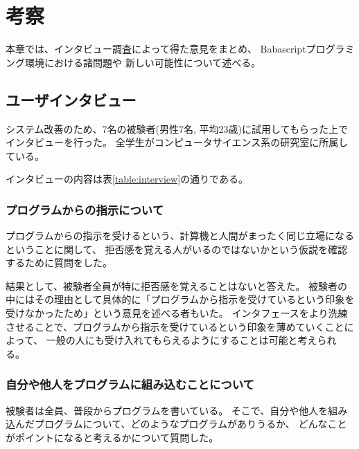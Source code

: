 \chapter{考察}\label{chap:discussion}

本章では、インタビュー調査によって得た意見をまとめ、
Babascriptプログラミング環境における諸問題や
新しい可能性について述べる。

\newpage

\section{ユーザインタビュー}\label{ux30e6ux30fcux30b6ux30a4ux30f3ux30bfux30d3ux30e5ux30fc}

システム改善のため、7名の被験者(男性7名,
平均23歳)に試用してもらった上でインタビューを行った。
全学生がコンピュータサイエンス系の研究室に所属している。

インタビューの内容は表\ref{table:interview}の通りである。

\subsection{プログラムからの指示について}\label{ux30d7ux30edux30b0ux30e9ux30e0ux304bux3089ux306eux6307ux793aux306bux3064ux3044ux3066}

プログラムからの指示を受けるという、計算機と人間がまったく同じ立場になるということに関して、
拒否感を覚える人がいるのではないかという仮説を確認するために質問をした。

結果として、被験者全員が特に拒否感を覚えることはないと答えた。
被験者の中にはその理由として具体的に「プログラムから指示を受けているという印象を受けなかったため」という意見を述べる者もいた。
インタフェースをより洗練させることで、プログラムから指示を受けているという印象を薄めていくことによって、
一般の人にも受け入れてもらえるようにすることは可能と考えられる。

\subsection{自分や他人をプログラムに組み込むことについて}\label{ux81eaux5206ux3084ux4ed6ux4ebaux3092ux30d7ux30edux30b0ux30e9ux30e0ux306bux7d44ux307fux8fbcux3080ux3053ux3068ux306bux3064ux3044ux3066}

被験者は全員、普段からプログラムを書いている。
そこで、自分や他人を組み込んだプログラムについて、どのようなプログラムがありうるか、
どんなことがポイントになると考えるかについて質問した。

